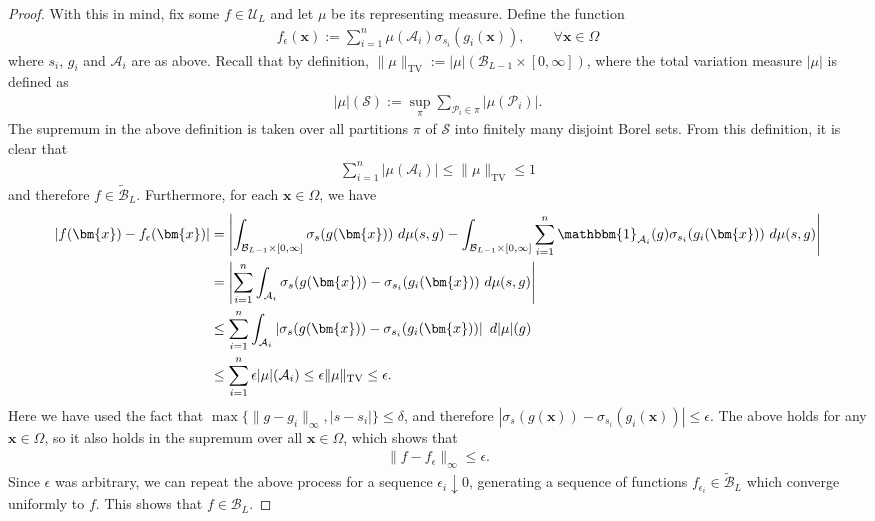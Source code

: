 \documentclass{article}
\DeclareMathOperator{\TV}{TV}
\def\vx{{\bm{x}}}
\def\cA{{\mathcal{A}}}
\def\cB{{\mathcal{B}}}
\def\cP{{\mathcal{P}}}
\def\cS{{\mathcal{S}}}
\def\cU{{\mathcal{U}}}
\begin{document}
\begin{appendices}
\begin{proof}
With this in mind, fix some $f \in \cU_L$ and let $\mu$ be its representing measure. Define the function
\begin{align}
    f_\epsilon(\vx) := \sum_{i=1}^n \mu(\cA_i) \sigma_{s_i}(g_i(\vx)), \qquad \forall \vx \in \Omega
\end{align}
where $s_i$, $g_i$ and $\cA_i$ are as above. Recall that by definition, $\| \mu \|_{\TV} := |\mu|(\cB_{L-1} \times [0,\infty])$, where the total variation measure $|\mu|$ is defined as
\begin{align}
    |\mu|(\cS) := \sup_{\pi} \sum_{\cP_i \in \pi} |\mu(\cP_i)|.
\end{align}
The supremum in the above definition is taken over all partitions $\pi$ of $\cS$ into finitely many disjoint Borel sets. From this definition, it is clear that 
\begin{align}
    \sum_{i=1}^n |\mu(\cA_i)| \leq \| \mu \|_{\TV} \leq 1
\end{align}
and therefore $f \in \widetilde{\cB}_L$. Furthermore, for each $\vx \in \Omega$, we have
\begin{align}
    |f(\vx) - f_\epsilon(\vx)| &= \left| \int_{\cB_{L-1} \times [0,\infty]} \sigma_s(g(  \vx))  \ d \mu(s,g) - \int_{\cB_{L-1} \times [0,\infty]} \sum_{i=1}^n \mathbbm{1}_{\cA_i}(g) \sigma_{s_i}(g_i(\vx)) \ d \mu(s,g)   \right| \\
    &= \left| \sum_{i=1}^n \int_{\cA_i} \sigma_s(g(\vx)) - \sigma_{s_i}(g_i(\vx)) \ d \mu(s,g) \right| \\
    &\leq \sum_{i=1}^n \int_{\cA_i} \left| \sigma_s(g(\vx)) - \sigma_{s_i}(g_i(\vx)) \right| \ d |\mu|(g) \\
    &\leq \sum_{i=1}^n \epsilon |\mu|(\cA_i) \leq \epsilon \| \mu \|_{\TV} \leq \epsilon.
\end{align}
Here we have used the fact that $\max\{ \| g - g_i \|_\infty, |s - s_i| \} \leq \delta$, and therefore $|\sigma_s(g(\vx)) - \sigma_{s_i}(g_i(\vx))| \leq \epsilon$. The above holds for any $\vx \in \Omega$, so it also holds in the supremum over all $\vx \in \Omega$, which shows that
\begin{align}
    \| f - f_\epsilon \|_\infty \leq \epsilon.
\end{align}
Since $\epsilon$ was arbitrary, we can repeat the above process for a sequence $\epsilon_i \downarrow 0$, generating a sequence of functions $f_{\epsilon_i} \in \widetilde{\cB}_L$ which converge uniformly to $f$. This shows that $f \in \cB_L$.
\end{proof}


\end{appendices}
\end{document}
